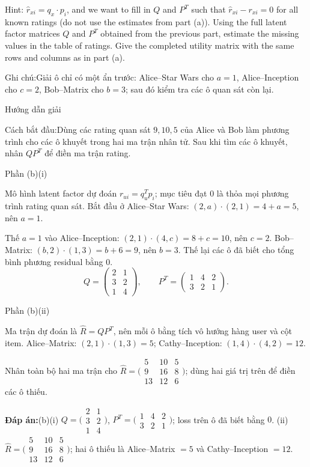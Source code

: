 \documentclass[10pt,a4paper,twocolumn]{article}
\makeatletter
\newcommand{\maptag}[1]{\phantomsection\@bsphack\protected@write\@auxout{}{\string\newlabel{#1}{{}{\thepage}{}{\@currentHref}{}}}\@esphack}
\newcommand{\key}[1]{#1:\enspace}
\newcommand{\solutionprompt}[1]{\par\addvspace{1pt}\noindent\key{Cách bắt đầu}#1\par\addvspace{2pt}}
\newcommand{\examnote}[1]{\par\addvspace{2pt}\noindent\key{Ghi chú}#1\par\addvspace{3pt}}
\newcommand{\blocklabel}[1]{\par\noindent#1\par\nobreak}
\newcommand{\answer}[1]{%
  \par\addvspace{3pt}%
  \blocklabel{#1Hướng dẫn giải}}
\newcommand{\finalanswer}[1]{%
  \par\addvspace{3pt}\noindent\textbf{Đáp án:}\nobreak\enspace#1\par}
\newcommand{\guidepart}[1]{%
  \par\addvspace{1.5pt}%
  \blocklabel{Phần #1}}
\makeatother
\begin{document}
Hint: $\hat r_{xi}=q_x\cdot p_i$, and we want to fill in $Q$ and $P^T$ such that $\hat r_{xi}-r_{xi}=0$ for all known ratings (do not use the estimates from part (a)).
 Using the full latent factor matrices $Q$ and $P^T$ obtained from the previous part, estimate the missing values in the table of ratings. Give the completed utility matrix with the same rows and columns as in part (a).

\examnote{Giải ô chỉ có một ẩn trước: Alice--Star Wars cho $a=1$, Alice--Inception cho $c=2$, Bob--Matrix cho $b=3$; sau đó kiểm tra các ô quan sát còn lại.}
\answer{\maptag{answer:A2-Q1b}\maptag{answer:P24-Q4b}}
\solutionprompt{Dùng các rating quan sát $9,10,5$ của Alice và Bob làm phương trình cho các ô khuyết trong hai ma trận nhân tử. Sau khi tìm các ô khuyết, nhân $QP^T$ để điền ma trận rating.}
\guidepart{(b)(i)}
\begin{guidesteps}
\item Mô hình latent factor dự đoán $r_{ui}=q_u^Tp_i$; mục tiêu đạt 0 là thỏa mọi phương trình rating quan sát. Bắt đầu ở Alice--Star Wars: $(2,a)\cdot(2,1)=4+a=5$, nên $a=1$.
\item Thế $a=1$ vào Alice--Inception: $(2,1)\cdot(4,c)=8+c=10$, nên $c=2$. Bob--Matrix: $(b,2)\cdot(1,3)=b+6=9$, nên $b=3$. Thế lại các ô đã biết cho tổng bình phương residual bằng 0.
\[
Q=\begin{pmatrix}2&1\\3&2\\1&4\end{pmatrix},\qquad
P^T=\begin{pmatrix}1&4&2\\3&2&1\end{pmatrix}.
\]
\end{guidesteps}
\guidepart{(b)(ii)}
\begin{guidesteps}
\item Ma trận dự đoán là $\widehat R=QP^T$, nên mỗi ô bằng tích vô hướng hàng user và cột item. Alice--Matrix: $(2,1)\cdot(1,3)=5$; Cathy--Inception: $(1,4)\cdot(4,2)=12$.
\item Nhân toàn bộ hai ma trận cho $\widehat R=\bigl(\begin{smallmatrix}5&10&5\\9&16&8\\13&12&6\end{smallmatrix}\bigr)$; dùng hai giá trị trên để điền các ô thiếu.
\end{guidesteps}
\finalanswer{(b)(i) $Q=\bigl(\begin{smallmatrix}2&1\\3&2\\1&4\end{smallmatrix}\bigr)$, $P^T=\bigl(\begin{smallmatrix}1&4&2\\3&2&1\end{smallmatrix}\bigr)$; loss trên ô đã biết bằng $0$. (ii) $\widehat R=\bigl(\begin{smallmatrix}5&10&5\\9&16&8\\13&12&6\end{smallmatrix}\bigr)$; hai ô thiếu là Alice--Matrix $=5$ và Cathy--Inception $=12$.}
\end{document}
